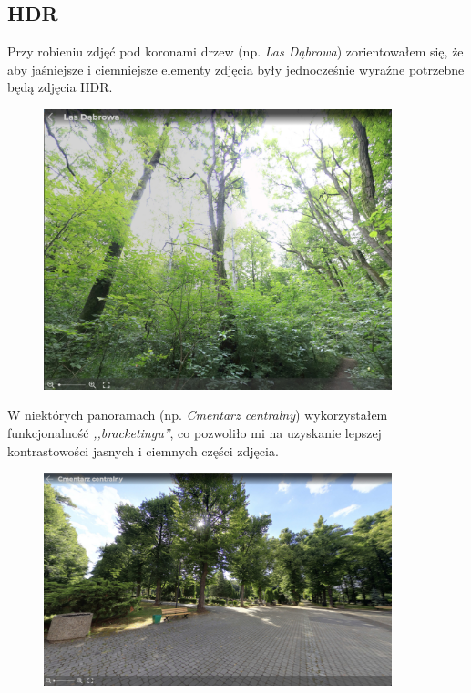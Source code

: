 \documentclass[a4paper]{mwart}
\begin{document}
\subsection{HDR}
Przy robieniu zdjęć pod koronami drzew (np. \textit{Las Dąbrowa}) zorientowałem
się, że aby jaśniejsze i ciemniejsze elementy zdjęcia były jednocześnie wyraźne
potrzebne będą zdjęcia HDR.
\begin{figure}[H]
\centering
\includegraphics[width=0.9\textwidth]{images/dabrowa.jpg}
\end{figure}

W niektórych panoramach (np. \textit{Cmentarz centralny}) wykorzystałem
funkcjonalność \textit{,,bracketingu''}, co pozwoliło mi na uzyskanie lepszej
kontrastowości jasnych i ciemnych części zdjęcia. 
\begin{figure}[H]
\centering
\includegraphics[width=0.9\textwidth]{images/cemetary.jpg}
\end{figure}
\end{document}
